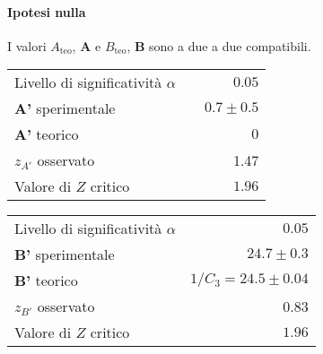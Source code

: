 \documentclass{article}
\begin{document}
	\paragraph{Ipotesi nulla} I valori $A_{\text{teo}}$, $\mathbf{A}$ e  $B_{\text{teo}}$, $\mathbf{B}$ sono a due a due compatibili.
	
	\vspace{0.7cm}
	\begin{minipage}{0.5\textwidth}
		\begin{table}[H]
			\centering
			\begin{tabular}{lr} 
				Livello di significatività $\alpha$		&$\quad 0.05$  \\
				\textbf{A'} sperimentale				& $\quad0.7 \pm 0.5 $\\
				\textbf{A'} teorico					&  $\quad0$ \\
				$z_{A'}$ osservato 					& $\quad$ 1.47 \\
				Valore di $Z$ critico     	& $\quad 1.96$
			\end{tabular}
		\end{table}
	\end{minipage}
	\begin{minipage}{0.5\textwidth}
		\begin{table}[H]
			\centering
			\begin{tabular}{lr} 
				Livello di significatività $\alpha$		&$ 0.05$  \\
				\textbf{B'} sperimentale				& $ 24.7 \pm  0.3$	\\
				\textbf{B'} teorico					& $ 1/C_3 = 24.5 \pm 0.04$ \footnotemark \\
				$z_{B'}$ osservato 					&  0.83 \\
				Valore di $Z$ critico     	& $ 1.96$
			\end{tabular}
		\end{table}
	\end{minipage}
	\vspace{0.7cm}
	
	
\end{document}
